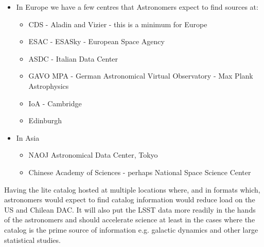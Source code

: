 \begin{itemize}
\item In Europe we have a few centres that Astronomers expect to find sources at:
\begin{itemize}
    \item CDS  - Aladin and Vizier - this is a minimum for Europe
    \item ESAC - ESASky - European Space Agency
    \item  ASDC - Italian Data Center
    \item  GAVO MPA - German Astronomical Virtual Observatory - Max Plank Astrophysics
    \item  IoA - Cambridge
    \item  Edinburgh
\end{itemize}
\item In Asia
\begin{itemize}
    \item  NAOJ Astronomical Data Center, Tokyo
    \item  Chinese Academy of Sciences - perhaps National Space Science Center
\end{itemize}
\end{itemize}

Having the lite catalog hosted at multiple locations where, and in formats which, astronomers would expect to find catalog information would reduce load on the US and Chilean DAC. It will also put the LSST data more readily in the hands of the astronomers and should accelerate science at least in the cases where the catalog is the prime source of information e.g. galactic dynamics and other large statistical studies.

